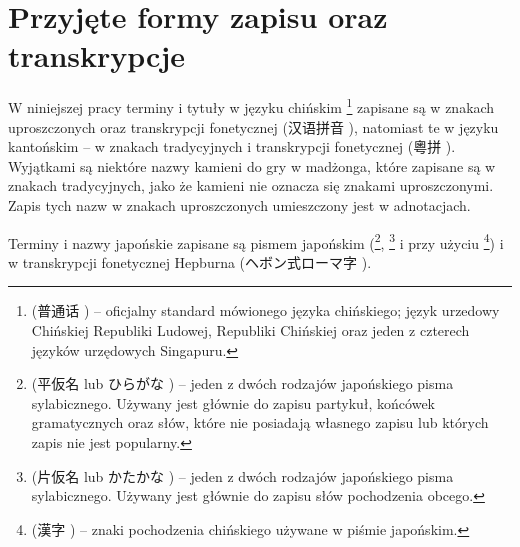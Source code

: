 \section{Przyjęte formy zapisu oraz transkrypcje}
W niniejszej pracy terminy i tytuły w języku chińskim
\footnote{ (普通话 ) --
oficjalny standard mówionego języka chińskiego; język urzedowy Chińskiej Republiki
Ludowej, Republiki Chińskiej oraz jeden z czterech języków urzędowych
Singapuru.} zapisane są w znakach uproszczonych oraz transkrypcji fonetycznej
 (汉语拼音 ), natomiast te w języku
kantońskim -- w znakach tradycyjnych i transkrypcji fonetycznej
 (粵拼 ). Wyjątkami są niektóre nazwy
kamieni do gry w madżonga, które zapisane są w znakach tradycyjnych, jako że
kamieni nie oznacza się znakami uproszczonymi. Zapis tych nazw w znakach
uproszczonych umieszczony jest w adnotacjach.

Terminy i nazwy japońskie zapisane są pismem japońskim
(\footnote{ (平仮名 lub ひらがな )
-- jeden z dwóch rodzajów japońskiego pisma sylabicznego. Używany jest głównie do
zapisu partykuł, końcówek gramatycznych oraz słów, które nie posiadają
własnego zapisu  lub których zapis  nie jest
popularny.}, \footnote{ (片仮名 lub かたかな
) -- jeden z dwóch rodzajów japońskiego pisma sylabicznego.
Używany jest głównie do zapisu słów pochodzenia obcego.} i przy użyciu
\footnote{ (漢字 ) -- znaki pochodzenia
chińskiego używane w piśmie japońskim.})  i w
transkrypcji fonetycznej Hepburna (ヘボン式ローマ字 
).
